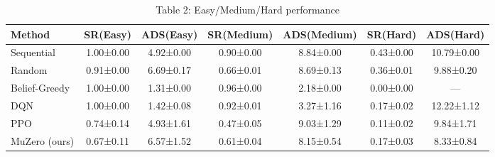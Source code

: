 \begin{table}[htbp]
\centering
\caption{Table 2: Easy/Medium/Hard performance}
\begin{tabular}{lcccccc}
\toprule
Method & SR(Easy) & ADS(Easy) & SR(Medium) & ADS(Medium) & SR(Hard) & ADS(Hard) \\
\midrule
Sequential & 1.00±0.00 & 4.92±0.00 & 0.90±0.00 & 8.84±0.00 & 0.43±0.00 & 10.79±0.00 \\
Random & 0.91±0.00 & 6.69±0.17 & 0.66±0.01 & 8.69±0.13 & 0.36±0.01 & 9.88±0.20 \\
Belief-Greedy & 1.00±0.00 & 1.31±0.00 & 0.96±0.00 & 2.18±0.00 & 0.00±0.00 & — \\
DQN & 1.00±0.00 & 1.42±0.08 & 0.92±0.01 & 3.27±1.16 & 0.17±0.02 & 12.22±1.12 \\
PPO & 0.74±0.14 & 4.93±1.61 & 0.47±0.05 & 9.03±1.29 & 0.11±0.02 & 9.84±1.71 \\
MuZero (ours) & 0.67±0.11 & 6.57±1.52 & 0.61±0.04 & 8.15±0.54 & 0.17±0.03 & 8.33±0.84 \\
\bottomrule
\end{tabular}
\end{table}
